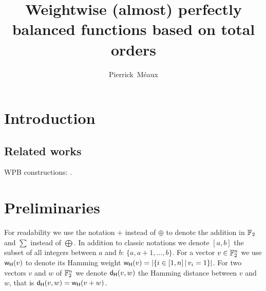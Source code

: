 \documentclass[11pt]{llncs}
\begin{document}
	\title{Weightwise (almost) perfectly balanced functions based on total orders}

	
	\author{
		\mbox{Pierrick M\'eaux}
	}
	
	
	

	
	
	
	\maketitle


\institute{
}	
	
	\begin{abstract}
	
		
	\end{abstract}


\section{Introduction}



	
\subsection{Related works}
	

	
WPB constructions:
\cite{TOSC:CarMeaRot17}
\cite{DCC:LiuMes19,CC:TangLiu19,DAM:LiSu20,CC:MesSu21,AMC:ZhangSu21,BFA:MesSuLi21,DAM:GuoSu22,DAM:ZhuSu22,archiv:MPJDL22,DAM:GinMea22,INDO:GinMea22,ACI:ManKuLar22,CC:MSLZ22,eprint:GinMea22c}.


\section{Preliminaries}


For readability we use the notation $+$ instead of 
$\oplus$ to denote the addition in $\mathbb{F}_2$ and $\sum$ instead of $\bigoplus$. 
In addition to classic notations we denote $ [a,b] $ the subset of all integers between $a$ and $b$: $\{a, a+1, \ldots,b\}$. 
For a vector $v\in \mathbb{F}_2^n$ we use $\mathsf{w_H}(v)$ to denote its Hamming weight $\mathsf{w_H}(v)=|\{ i \in [1,n] \, | \, v_i=1 \}|$. For two vectors $v$ and $w$ of $\mathbb{F}_2^n$ we denote $\mathsf{d_H}(v,w)$ the Hamming distance between $v$ and $w$, that is $\mathsf{d_H}(v,w)=\mathsf{w_H}(v+w)$.
\end{document}
